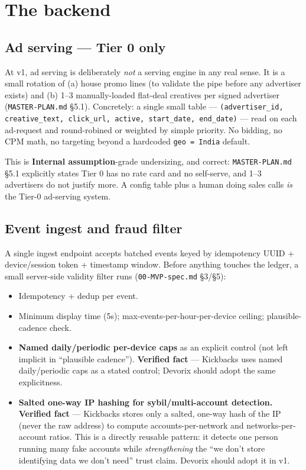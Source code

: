 \section{The backend}
\label{sec:backend}

\subsection{Ad serving --- Tier 0 only}
\label{sec:ad-serving-tier0}

At v1, ad serving is deliberately \textit{not} a serving engine in any real sense. It is a small rotation of (a) house promo lines (to validate the pipe before any advertiser exists) and (b) 1--3 manually-loaded flat-deal creatives per signed advertiser (\texttt{MASTER-PLAN.md} \S5.1). Concretely: a single small table --- \texttt{(advertiser\_id, creative\_text, click\_url, active, start\_date, end\_date)} --- read on each ad-request and round-robined or weighted by simple priority. No bidding, no CPM math, no targeting beyond a hardcoded \texttt{geo = India} default.

This is \textbf{Internal assumption}-grade undersizing, and correct: \texttt{MASTER-PLAN.md} \S5.1 explicitly states Tier 0 has no rate card and no self-serve, and 1--3 advertisers do not justify more. A config table plus a human doing sales calls \textit{is} the Tier-0 ad-serving system.

\subsection{Event ingest and fraud filter}
\label{sec:event-ingest}

A single ingest endpoint accepts batched events keyed by idempotency UUID + device/session token + timestamp window. Before anything touches the ledger, a small server-side validity filter runs (\texttt{00-MVP-spec.md} \S3/\S5):

\begin{itemize}
  \item Idempotency + dedup per event.
  \item Minimum display time (5s); max-events-per-hour-per-device ceiling; plausible-cadence check.
  \item \textbf{Named daily/periodic per-device caps} as an explicit control (not left implicit in ``plausible cadence''). \textbf{Verified fact} \citep{kickbacks_faq_2026} --- Kickbacks uses named daily/periodic caps as a stated control; Devorix should adopt the same explicitness.
  \item \textbf{Salted one-way IP hashing for sybil/multi-account detection.} \textbf{Verified fact} \citep{kickbacks_faq_2026} --- Kickbacks stores only a salted, one-way hash of the IP (never the raw address) to compute accounts-per-network and networks-per-account ratios. This is a directly reusable pattern: it detects one person running many fake accounts while \textit{strengthening} the ``we don't store identifying data we don't need'' trust claim. Devorix should adopt it in v1.
\end{itemize}

